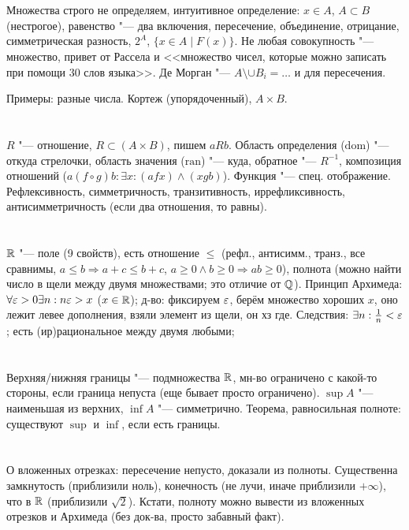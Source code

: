\section{} %
Множества строго не определяем, интуитивное определение: $x \in A$, $A \subset B$ (нестрогое),
равенство "--- два включения, пересечение, объединение, отрицание, симметрическая разность, $2^A$,
$\{x \in A \mid F(x) \}$. Не любая совокупность "--- множество, привет от Рассела и <<множество чисел,
которые можно записать при помощи 30 слов языка>>. Де Морган "--- $A\setminus\cup B_i=\dots$ и для пересечения.

Примеры: разные числа. Кортеж (упорядоченный), $A \times B$.

\section{} %
$R$ "--- отношение, $R \subset (A \times B)$, пишем $aRb$. Область определения ($\mathrm{dom}$) "---
откуда стрелочки, область значения ($\mathrm{ran}$) "--- куда, обратное "--- $R^{-1}$, композиция отношений
($a(f\circ g)b: \exists x: (a f x) \land (x g b)$). Функция "--- спец. отображение. Рефлексивность,
симметричность, транзитивность, иррефликсивность, антисимметричность (если два отношения, то равны).

\section{} %
$\mathbb{R}$ "--- поле (9 свойств), есть отношение $\le$ (рефл., антисимм., транз., все сравнимы,
$a \le b \Rightarrow a + c \le b + c$, $a \ge 0 \land b \ge 0 \Rightarrow ab \ge 0$), полнота
(можно найти число в щели между двумя множествами; это отличие от $\mathbb{Q}$). Принцип
Архимеда: $\forall \varepsilon > 0 \exists n: n\varepsilon > x$ ($x \in \mathbb{R}$); д-во: фиксируем $\varepsilon$,
берём множество хороших $x$, оно лежит левее дополнения, взяли элемент из щели, он хз где. Следствия:
$\exists n: \frac 1 n < \varepsilon$; есть (ир)рациональное между двумя любыми;

\section{} %
Верхняя/нижняя границы "--- подмножества $\mathbb{R}$, мн-во ограничено с какой-то стороны, если граница непуста
(еще бывает просто ограничено). $\sup A$ "--- наименьшая из верхних, $\inf A$ "--- симметрично.
Теорема, равносильная полноте: существуют $\sup$ и $\inf$, если есть границы. 

\section{} %
О вложенных отрезках: пересечение непусто, доказали из полноты. Существенна замкнутость (приблизили ноль), конечность
(не лучи, иначе приблизили $+\infty$), что в $\mathbb{R}$ (приблизили $\sqrt 2$). Кстати, полноту можно
вывести из вложенных отрезков и Архимеда (без док-ва, просто забавный факт).
